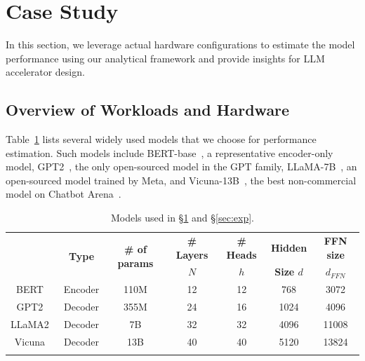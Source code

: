\section{Case Study}
\label{sec:case_study}
In this section, we leverage actual hardware configurations to estimate the model performance using our analytical framework and provide insights for LLM accelerator design.

\subsection{Overview of Workloads and Hardware}
\label{sub:workload_hardware}
Table~\ref{tab:models} lists several widely used models that we choose for performance estimation. 
Such models include BERT-base~\cite{devlin2018bert}, a representative encoder-only model,
GPT2~\cite{radford2019gpt2}, the only open-sourced model in the GPT family,
LLaMA-7B~\cite{touvron2023llama,touvron2023llama2}, an open-sourced model trained by Meta,  
and Vicuna-13B~\cite{chiang2023vicuna}, the best non-commercial model on Chatbot Arena~\cite{zheng2023chatbotarena}.
\begin{table}[t]
    \centering
    \caption{Models used in \S\ref{sec:case_study} and \S\ref{sec:exp}.}
    \label{tab:models}
    \small
    \begin{tabular}{ccccccc}\Xhline{1pt}
        \multirow{2}{*}{\textbf{Model}} & \multirow{2}{*}{\textbf{Type}} & \multirow{2}{*}{\textbf{\# of params}} & \textbf{\# Layers} & \textbf{\# Heads} & \textbf{Hidden} & \textbf{FFN size}\\
        &  & & \textbf{$N$} & \textbf{$h$} & \textbf{Size $d$} & \textbf{$d_{FFN}$}\\\Xhline{1pt}
        BERT~\cite{devlin2018bert} & Encoder & 110M & 12 & 12 & 768 & 3072 \\
        GPT2~\cite{radford2019gpt2} & Decoder & 355M & 24 & 16 & 1024 & 4096 \\
        LLaMA2~\cite{touvron2023llama2} & Decoder & 7B & 32 & 32 & 4096 & 11008\\
        Vicuna~\cite{chiang2023vicuna} & Decoder & 13B & 40 & 40 & 5120 & 13824\\
        \Xhline{1pt}
    \end{tabular}
\end{table}

